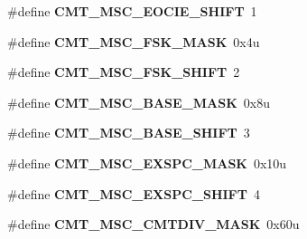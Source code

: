\begin{DoxyCompactItemize}
\item 
\hypertarget{group___c_m_t___register___masks_gaa7fa1a5e01690a63a09459cca5b763d0}{}\#define {\bfseries C\+M\+T\+\_\+\+M\+S\+C\+\_\+\+E\+O\+C\+I\+E\+\_\+\+S\+H\+I\+F\+T}~1\label{group___c_m_t___register___masks_gaa7fa1a5e01690a63a09459cca5b763d0}

\item 
\hypertarget{group___c_m_t___register___masks_gae434ad9168835c6d9e4d941a90a568cb}{}\#define {\bfseries C\+M\+T\+\_\+\+M\+S\+C\+\_\+\+F\+S\+K\+\_\+\+M\+A\+S\+K}~0x4u\label{group___c_m_t___register___masks_gae434ad9168835c6d9e4d941a90a568cb}

\item 
\hypertarget{group___c_m_t___register___masks_ga73422722bbae07a50d0b2b473f5f9417}{}\#define {\bfseries C\+M\+T\+\_\+\+M\+S\+C\+\_\+\+F\+S\+K\+\_\+\+S\+H\+I\+F\+T}~2\label{group___c_m_t___register___masks_ga73422722bbae07a50d0b2b473f5f9417}

\item 
\hypertarget{group___c_m_t___register___masks_gac099af54e9456cad9c3343184d3e041a}{}\#define {\bfseries C\+M\+T\+\_\+\+M\+S\+C\+\_\+\+B\+A\+S\+E\+\_\+\+M\+A\+S\+K}~0x8u\label{group___c_m_t___register___masks_gac099af54e9456cad9c3343184d3e041a}

\item 
\hypertarget{group___c_m_t___register___masks_ga3ddb10ae744a6e2149a0d0185a796571}{}\#define {\bfseries C\+M\+T\+\_\+\+M\+S\+C\+\_\+\+B\+A\+S\+E\+\_\+\+S\+H\+I\+F\+T}~3\label{group___c_m_t___register___masks_ga3ddb10ae744a6e2149a0d0185a796571}

\item 
\hypertarget{group___c_m_t___register___masks_gafeb71169b6c47237583101487f6412e1}{}\#define {\bfseries C\+M\+T\+\_\+\+M\+S\+C\+\_\+\+E\+X\+S\+P\+C\+\_\+\+M\+A\+S\+K}~0x10u\label{group___c_m_t___register___masks_gafeb71169b6c47237583101487f6412e1}

\item 
\hypertarget{group___c_m_t___register___masks_ga7a71704451408ca7e8c8802fa72d4e4d}{}\#define {\bfseries C\+M\+T\+\_\+\+M\+S\+C\+\_\+\+E\+X\+S\+P\+C\+\_\+\+S\+H\+I\+F\+T}~4\label{group___c_m_t___register___masks_ga7a71704451408ca7e8c8802fa72d4e4d}

\item 
\hypertarget{group___c_m_t___register___masks_gab663f14909462192c6e432c7bd0e56bf}{}\#define {\bfseries C\+M\+T\+\_\+\+M\+S\+C\+\_\+\+C\+M\+T\+D\+I\+V\+\_\+\+M\+A\+S\+K}~0x60u\label{group___c_m_t___register___masks_gab663f14909462192c6e432c7bd0e56bf}


\end{DoxyCompactItemize}
